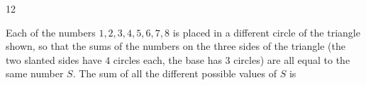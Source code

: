 \begin{probbox}{12}{\relax}
\begin{minipage}[t]{0.63\linewidth}
Each of the numbers $1, 2, 3, 4, 5, 6, 7, 8$ is placed in a different circle of the triangle shown, so that the sums of the numbers on the
three sides of the triangle (the two slanted sides have $4$ circles each, the base has $3$ circles) are all equal to the same number $S$.
The sum of all the different possible values of $S$ is
\end{minipage}\hfill
\begin{minipage}[t]{0.33\linewidth}\vspace{0pt}\centering
\lgaTriEight{}{}{}{}{}{}{}{}
\end{minipage}
\end{probbox}
